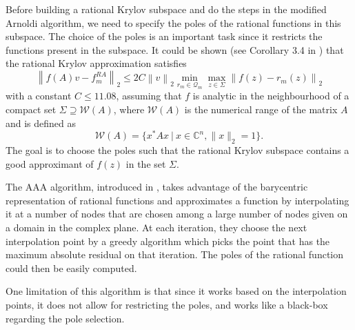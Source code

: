 Before building a rational Krylov subspace and do the steps in the modified Arnoldi
algorithm, we need to specify the poles of the rational functions in this subspace.
The choice of the poles is an important task since it restricts the functions present
in the subspace. It could be shown (see Corollary 3.4 in \cite{guttel2013rational}) that
the rational Krylov approximation satisfies
\begin{equation*}
    \left\| f(A)v - f_m^{RA}  \right\|_2 \le 2 C \left\| v \right\|_2
    \min_{r_m \in \mathcal{Q}_{m}} \max_{z \in \Sigma} \left\| f(z) - r_m(z) \right\|_2
\end{equation*}
with a constant $C \le 11.08$, assuming that $f$ is analytic in the neighbourhood of
a compact set $\Sigma \supseteq \mathcal{W}(A)$, where $\mathcal{W}(A)$ is the numerical range
of the matrix $A$ and is defined as
\begin{equation}
    \label{eq:numericalrange}
    \mathcal{W}(A) = \{x^* A x \:|\: x \in \mathbb{C}^{n}, \|x\|_2=1\}.
\end{equation}
The goal is to choose the poles such that the rational Krylov subspace contains a good approximant
of $f(z)$ in the set $\Sigma$.

The AAA algorithm, introduced in \cite{nakatsukasa2018AAA}, takes advantage of the barycentric
representation of rational functions and approximates a function by interpolating it at a number
of nodes that are chosen among a large number of nodes given on a domain in the complex plane.
At each iteration, they choose the next interpolation point by a greedy algorithm which picks
the point that has the maximum absolute residual on that iteration. The poles of the rational
function could then be easily computed.

One limitation of this algorithm is that since it works based on the interpolation points,
it does not allow for restricting the poles, and works like a black-box regarding the pole selection.

